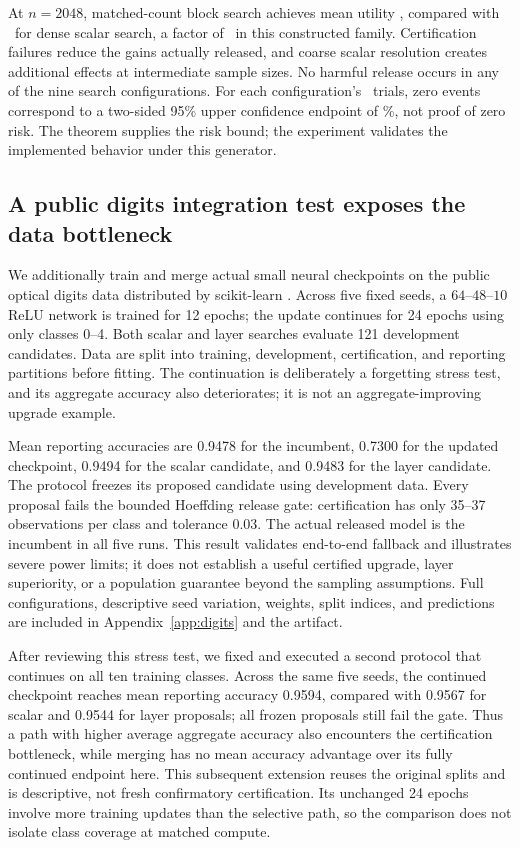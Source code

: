 \documentclass[11pt,letterpaper]{article}
\begin{document}
At $n=2048$, matched-count block search achieves mean utility \BlockGain, compared with \ScalarGain\ for dense scalar search, a factor of \BlockRatio\ in this constructed family. Certification failures reduce the gains actually released, and coarse scalar resolution creates additional effects at intermediate sample sizes. No harmful release occurs in any of the nine search configurations. For each configuration's \SearchTrials\ trials, zero events correspond to a two-sided 95\% upper confidence endpoint of \ZeroHarmUpper\%, not proof of zero risk. The theorem supplies the risk bound; the experiment validates the implemented behavior under this generator.

\subsection{A public digits integration test exposes the data bottleneck}
We additionally train and merge actual small neural checkpoints on the public optical digits data distributed by scikit-learn \citep{sklearn_digits,uci_digits}. Across five fixed seeds, a $64$--$48$--$10$ ReLU network is trained for 12 epochs; the update continues for 24 epochs using only classes 0--4. Both scalar and layer searches evaluate 121 development candidates. Data are split into training, development, certification, and reporting partitions before fitting. The continuation is deliberately a forgetting stress test, and its aggregate accuracy also deteriorates; it is not an aggregate-improving upgrade example.

Mean reporting accuracies are 0.9478 for the incumbent, 0.7300 for the updated checkpoint, 0.9494 for the scalar candidate, and 0.9483 for the layer candidate. The protocol freezes its proposed candidate using development data. Every proposal fails the bounded Hoeffding release gate: certification has only 35--37 observations per class and tolerance 0.03. The actual released model is the incumbent in all five runs. This result validates end-to-end fallback and illustrates severe power limits; it does not establish a useful certified upgrade, layer superiority, or a population guarantee beyond the sampling assumptions. Full configurations, descriptive seed variation, weights, split indices, and predictions are included in Appendix~\ref{app:digits} and the artifact.

After reviewing this stress test, we fixed and executed a second protocol that continues on all ten training classes. Across the same five seeds, the continued checkpoint reaches mean reporting accuracy 0.9594, compared with 0.9567 for scalar and 0.9544 for layer proposals; all frozen proposals still fail the gate. Thus a path with higher average aggregate accuracy also encounters the certification bottleneck, while merging has no mean accuracy advantage over its fully continued endpoint here. This subsequent extension reuses the original splits and is descriptive, not fresh confirmatory certification. Its unchanged 24 epochs involve more training updates than the selective path, so the comparison does not isolate class coverage at matched compute.
\end{document}
